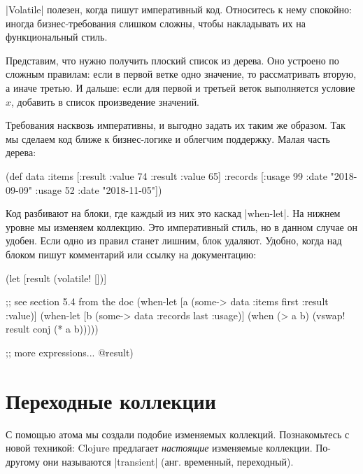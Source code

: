 \spverb|Volatile| полезен, когда пишут императивный код. Относитесь к нему
спокойно: иногда бизнес-требования слишком сложны, чтобы накладывать их на
функциональный стиль.

Представим, что нужно получить плоский список из дерева. Оно устроено по сложным
правилам: если в первой ветке одно значение, то рассматривать вторую, а иначе
третью. И дальше: если для первой и третьей веток выполняется условие $x$,
добавить в список произведение значений.


Требования насквозь императивны, и выгодно задать их таким же образом. Так мы
сделаем код ближе к бизнес-логике и облегчим поддержку. Малая часть дерева:

\begin{english}
  \begin{clojure}
(def data
  {:items [{:result {:value 74}}
           {:result {:value 65}}]
   :records [{:usage 99 :date "2018-09-09"}
             {:usage 52 :date "2018-11-05"}]})
  \end{clojure}
\end{english}

Код разбивают на блоки, где каждый из них это каскад \spverb|when-let|. На
нижнем уровне мы изменяем коллекцию. Это императивный стиль, но в данном случае
он удобен. Если одно из правил станет лишним, блок удаляют. Удобно, когда над
блоком пишут комментарий или ссылку на документацию:

\begin{english}
  \begin{clojure}
(let [result (volatile! [])]

  ;; see section 5.4 from the doc
  (when-let [a (some-> data :items first :result :value)]
    (when-let [b (some-> data :records last :usage)]
      (when (> a b)
        (vswap! result conj (* a b)))))

  ;; more expressions...
  @result)
  \end{clojure}
\end{english}

\section{Переходные коллекции}


С помощью атома мы создали подобие изменяемых коллекций. Познакомьтесь с новой
техникой: Clojure предлагает \emph{настоящие} изменяемые коллекции. По-другому
они называются \spverb|transient| (анг. временный, переходный).

